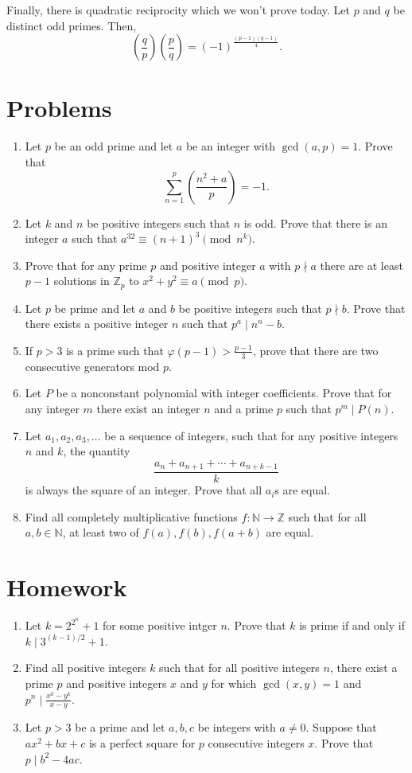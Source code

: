 \documentclass{article}
\newcommand\Zz{\mathbb{Z}}
\begin{document}
Finally, there is quadratic reciprocity which we won't prove today.
Let $p$ and $q$ be distinct odd primes. Then,
\[\left(\frac qp\right)\left(\frac pq\right)=(-1)^{\frac{(p-1)(q-1)}4}.\]
\section{Problems}
\begin{enumerate}
  \item Let $p$ be an odd prime and let $a$ be an integer with $\gcd(a,p)=1$.
    Prove that
    \[\sum_{n=1}^p\left(\frac{n^2+a}p\right)=-1.\]
  \item Let $k$ and $n$ be positive integers such that $n$ is odd. Prove that
    there is an integer $a$ such that $a^{32}\equiv(n+1)^3\pmod{n^k}$.
  \item Prove that for any prime $p$ and positive integer $a$ with $p\nmid a$
    there are at least $p-1$ solutions in $\Zz_p$ to $x^2+y^2\equiv a\pmod p$.
  \item Let $p$ be prime and let $a$ and $b$ be positive integers such that
    $p\nmid b$. Prove that there exists a positive integer $n$ such that
    $p^a\mid n^n-b$.
  \item If $p>3$ is a prime such that $\varphi(p-1)>\frac{p-1}3$, prove that
    there are two consecutive generators mod $p$.
  \item Let $P$ be a nonconstant polynomial with integer coefficients. Prove that for any
    integer $m$ there exist an integer $n$ and a prime $p$ such that $p^m\mid
    P(n)$.
  \item Let $a_1,a_2,a_3,\ldots$ be a sequence of integers, such that for any
    positive integers $n$ and $k$, the quantity
    \[\frac{a_n+a_{n+1}+\cdots+a_{n+k-1}}k\]
    is always the square of an integer. Prove that all $a_i$s are equal.
  \item Find all completely multiplicative functions $f:\mathbb N\to\mathbb Z$
    such that for all $a,b\in\mathbb N$, at least two of $f(a),f(b),f(a+b)$ are
    equal.
\end{enumerate}
\newpage
\section{Homework}
\begin{enumerate}
  \item Let $k=2^{2^n}+1$ for some positive intger $n$. Prove that $k$ is prime
    if and only if $k\mid 3^{(k-1)/2}+1$.
  \item Find all positive integers $k$ such that for all positive integers $n$,
    there exist a prime $p$ and positive integers $x$ and $y$ for which
    $\gcd(x,y)=1$ and $p^n\mid \frac{x^k-y^k}{x-y}$.
  \item Let $p>3$ be a prime and let $a,b,c$ be integers with $a\ne 0$. Suppose
    that $ax^2+bx+c$ is a perfect square for $p$ consecutive integers $x$. Prove
    that $p\mid b^2-4ac$.
\end{enumerate}
\end{document}
